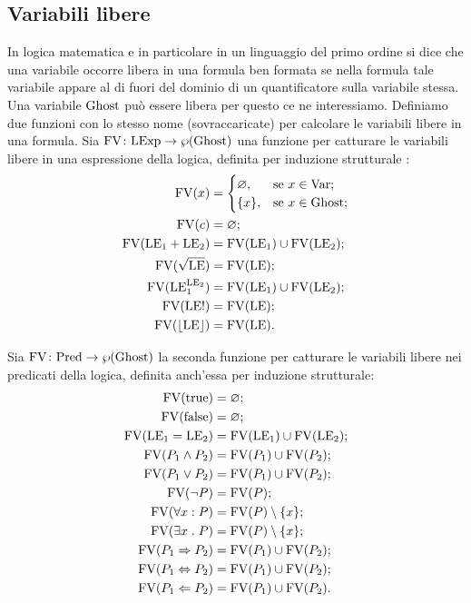 \subsection{Variabili libere}
In logica matematica e in particolare in un linguaggio del primo ordine si dice che una variabile occorre libera in una formula ben formata se nella formula tale variabile appare al di fuori del dominio di un quantificatore sulla variabile stessa. Una variabile $\mathrm{Ghost}$ può essere libera per questo ce ne interessiamo.
Definiamo due funzioni con lo stesso nome (sovraccaricate) per calcolare le variabili libere in una formula.
Sia $\mathord{\mathrm{FV}}\colon\mathrm{LExp}\to\wp(\mathrm{Ghost})$ una funzione per catturare le variabili libere in una espressione della logica, definita per induzione strutturale :
\begin{align*}
   \mathrm{FV}(x)
      &=
        \begin{cases}
            \varnothing,&\text{se $x  \in \mathrm{Var}$};\\
            \{x\},    &\text{se $x  \in \mathrm{Ghost}$};
        \end{cases} \\
   \mathrm{FV}(c)
      &= \varnothing;\\
   \mathrm{FV}(\mathrm{LE}_1 + \mathrm{LE}_2)
      &= \mathrm{FV}(\mathrm{LE}_1) \cup \mathrm{FV}(\mathrm{LE}_2);\\
   \mathrm{FV}(\sqrt{\mathrm{LE}})
      &= \mathrm{FV}(\mathrm{LE});\\
   \mathrm{FV}(\mathrm{LE}_1^{\mathrm{LE}_2})
      &= \mathrm{FV}(\mathrm{LE}_1) \cup \mathrm{FV}(\mathrm{LE}_2);\\
   \mathrm{FV}(\mathrm{LE}!)
      &= \mathrm{FV}(\mathrm{LE});\\
   \mathrm{FV}(\lfloor \mathrm{LE} \rfloor)
      &= \mathrm{FV}(\mathrm{LE}).
\end{align*}

Sia $\mathord{\mathrm{FV}}\colon\mathrm{Pred}\to\wp(\mathrm{Ghost})$ la seconda funzione per catturare le variabili libere nei predicati della logica, definita anch'essa per induzione strutturale:
\begin{align*}
   \mathrm{FV}(\mathrm{true})
      &= \varnothing;\\
   \mathrm{FV}(\mathrm{false})
      &= \varnothing;\\
   \mathrm{FV}(\mathrm{LE}_1 = \mathrm{LE}_2)
      &= \mathrm{FV}(\mathrm{LE}_1) \cup \mathrm{FV}(\mathrm{LE}_2);\\
   \mathrm{FV}(P_1 \land P_2)
      &= \mathrm{FV}(P_1) \cup \mathrm{FV}(P_2);\\
   \mathrm{FV}(P_1 \lor P_2)
      &= \mathrm{FV}(P_1) \cup \mathrm{FV}(P_2);\\
   \mathrm{FV}(\neg P)
      &= \mathrm{FV}(P);\\
   \mathrm{FV}(\forall x \mathrel{:} P)
      &= \mathrm{FV}(P)\setminus \{x\};\\
   \mathrm{FV}(\exists x \mathrel{.} P)
      &= \mathrm{FV}(P)\setminus \{x\};\\
   \mathrm{FV}(P_1 \Rightarrow P_2)
      &= \mathrm{FV}(P_1) \cup \mathrm{FV}(P_2);\\
   \mathrm{FV}(P_1 \Leftrightarrow P_2)
      &= \mathrm{FV}(P_1) \cup \mathrm{FV}(P_2);\\
   \mathrm{FV}(P_1 \Leftarrow P_2)
      &= \mathrm{FV}(P_1) \cup \mathrm{FV}(P_2).
\end{align*}

